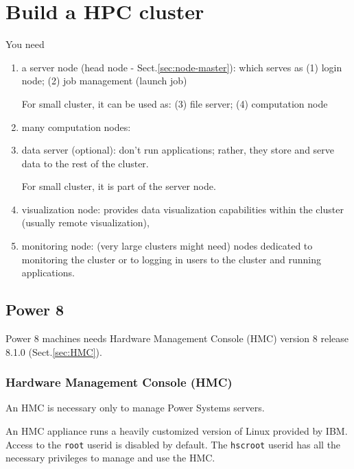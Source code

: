 \chapter{Build a HPC cluster}


You need
\begin{enumerate}
  \item a server node (head node - Sect.\ref{sec:node-master}): which serves as
  (1) login node; (2) job management (launch job)
  
  
For small cluster, it can be used as: (3) file server; (4) computation node
  
  \item many computation nodes:
  
  
  \item data server (optional): don't run applications; rather, they store and
  serve data to the rest of the cluster. 
  
For small cluster, it is part of the server node.
  
  \item visualization node: provides data visualization capabilities within the
  cluster (usually remote visualization), 
  
  \item monitoring node: (very large clusters might need) nodes dedicated to
  monitoring the cluster or to logging in users to the cluster and running
  applications.
   
  
\end{enumerate}

\section{Power 8}

Power 8 machines needs Hardware Management Console (HMC) version 8 release
8.1.0 (Sect.\ref{sec:HMC}).  


\subsection{Hardware Management Console (HMC)}
\label{sec:Hardware-Management-Console}
\label{sec:HMC}


An HMC is necessary only to manage Power Systems servers.

An HMC appliance runs a heavily customized version of Linux provided by IBM.
Access to the \verb!root! userid is disabled by default. The \verb!hscroot!
userid has all the necessary privileges to manage and use the HMC.





